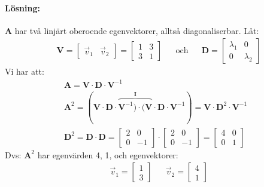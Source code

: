 \begin{Ex}
	\paragraph{Lösning:} %
	\label{par:l_sning_}
	\textbf{A} har två linjärt oberoende egenvektorer, alltså diagonaliserbar. Låt:
	\begin{align*}
	&\mathbf{V} = 
	\begin{bmatrix}
		\vec{v}_1 & \vec{v}_2
	\end{bmatrix}
	= 
	\begin{bmatrix}
		1 & 3\\
		3 & 1
	\end{bmatrix}
	&&\mbox{och}
	&&\mathbf{D} = 
	\begin{bmatrix}
		\lambda_1 & 0\\
		0 & \lambda_2
	\end{bmatrix}
	\end{align*}
	Vi har att:
	\begin{gather*}
		\mathbf{A} = \mathbf{V} \cdot \mathbf{D} \cdot \mathbf{V}^{-1}\\
		\mathbf{A}^2 = (\mathbf{V} \cdot \mathbf{D} \cdot \overbrace{\mathbf{V}^{-1}) \cdot (\mathbf{V}}^{\mathbf{I}} \cdot \mathbf{D} \cdot \mathbf{V}^{-1}) = \mathbf{V} \cdot \mathbf{D}^2 \cdot \mathbf{V}^{-1}\\
		\mathbf{D}^2 = \mathbf{D} \cdot \mathbf{D} = 
		\begin{bmatrix}
			2 & 0\\
			0 & -1
		\end{bmatrix} \cdot
		\begin{bmatrix}
			2 & 0\\
			0 & -1
		\end{bmatrix}
		=
		\begin{bmatrix}
			4 & 0\\
			0 & 1
		\end{bmatrix}
	\end{gather*}
	Dvs: $\mathbf{A}^2$ har egenvärden 4, 1, och egenvektorer:
	\begin{align*}
	&\vec{v}_1 = \begin{bmatrix} 1\\3 \end{bmatrix}
	&& \vec{v}_2 = \begin{bmatrix} 4\\1 \end{bmatrix}
	\end{align*}
	
\end{Ex}


